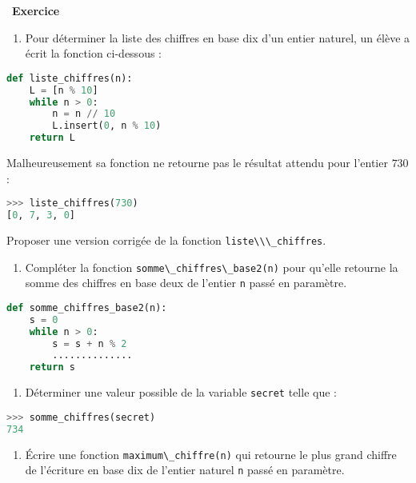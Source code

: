 \documentclass[
  11pt,
]{article}
\newcommand{\passthrough}[1]{#1}
\providecommand{\tightlist}{%
  \setlength{\itemsep}{0pt}\setlength{\parskip}{0pt}}
\newcounter{exo}
\newenvironment{exercice}[1]
{\par \medskip   \addtocounter{exo}{1} \noindent  
\begin{bclogo}[arrondi =0.1,   noborder = true, logo=\bccrayon, marge=4]{~\textbf{Exercice} \textbf{\theexo} {\itshape #1} }  \par}
{
\end{bclogo}
 \par \bigskip }
\newcounter{def}
\begin{document}
\begin{exercice}{}

\begin{enumerate}
\def\labelenumi{\arabic{enumi}.}
\tightlist
\item
  Pour déterminer la liste des chiffres en base dix d'un entier naturel,
  un élève a écrit la fonction ci-dessous :
\end{enumerate}

\begin{lstlisting}[language=Python]
def liste_chiffres(n):
    L = [n % 10]
    while n > 0:
        n = n // 10
        L.insert(0, n % 10)
    return L
\end{lstlisting}

Malheureusement sa fonction ne retourne pas le résultat attendu pour
l'entier \(730\) :

\begin{lstlisting}[language=Python]
>>> liste_chiffres(730)
[0, 7, 3, 0]
\end{lstlisting}

Proposer une version corrigée de la fonction
\passthrough{\lstinline!liste\\\_chiffres!}.

\begin{enumerate}
\def\labelenumi{\arabic{enumi}.}
\setcounter{enumi}{1}
\tightlist
\item
  Compléter la fonction
  \passthrough{\lstinline!somme\_chiffres\_base2(n)!} pour qu'elle
  retourne la somme des chiffres en base deux de l'entier
  \passthrough{\lstinline!n!} passé en paramètre.
\end{enumerate}

\begin{lstlisting}[language=Python]
def somme_chiffres_base2(n):
    s = 0
    while n > 0:
        s = s + n % 2
        ..............
    return s
\end{lstlisting}

\begin{enumerate}
\def\labelenumi{\arabic{enumi}.}
\setcounter{enumi}{2}
\tightlist
\item
  Déterminer une valeur possible de la variable \texttt{secret} telle
  que :
\end{enumerate}

\begin{lstlisting}[language=Python]
>>> somme_chiffres(secret)
734
\end{lstlisting}

\begin{enumerate}
\def\labelenumi{\arabic{enumi}.}
\setcounter{enumi}{3}
\tightlist
\item
  Écrire une fonction \passthrough{\lstinline!maximum\_chiffre(n)!} qui
  retourne le plus grand chiffre de l'écriture en base dix de l'entier
  naturel \passthrough{\lstinline!n!} passé en paramètre.
\end{enumerate}

\end{exercice}
\end{document}

